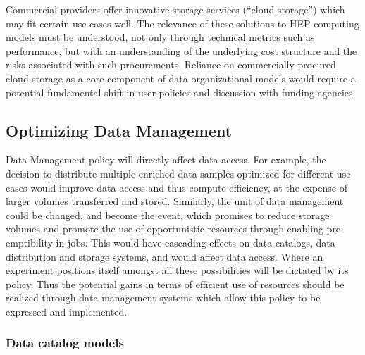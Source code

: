 \documentclass[12pt,a4paper]{article}
\begin{document}
Commercial providers offer innovative storage services (``cloud
storage'') which may fit certain use cases well. The relevance of these
solutions to HEP computing models must be understood, not only through
technical metrics such as performance, but with an understanding of the
underlying cost structure and the risks associated with such
procurements. Reliance on commercially procured cloud storage as a core
component of data organizational models would require a potential
fundamental shift in user policies and discussion with funding agencies.

\subsection{Optimizing Data Management}\label{optimizing-data-management}

Data Management policy will directly affect data access. For example,
the decision to distribute multiple enriched data-samples optimized for
different use cases would improve data access and thus compute
efficiency, at the expense of larger volumes transferred and stored.
Similarly, the unit of data management could be changed, and become the
event, which promises to reduce storage volumes and promote the use of
opportunistic resources through enabling pre-emptibility in jobs. This
would have cascading effects on data catalogs, data distribution and
storage systems, and would affect data access. Where an experiment
positions itself amongst all these possibilities will be dictated by its
policy. Thus the potential gains in terms of efficient use of resources
should be realized through data management systems which allow this
policy to be expressed and implemented.

\subsubsection{Data catalog models}\label{data-catalog-models}
\end{document}
